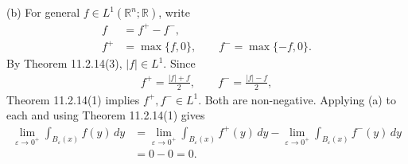 \documentclass[12pt,a4paper]{article}
\begin{document}
(b) For general $f\in L^1(\mathbb{R}^n;\mathbb{R})$, write
\begin{align*}
f&=f^+-f^-,\\
f^+&=\max\{f,0\},\qquad f^-=\max\{-f,0\}.
\end{align*}
By Theorem 11.2.14(3), $|f|\in L^1$. Since
\begin{align*}
f^+=\frac{|f|+f}{2},\qquad f^-=\frac{|f|-f}{2},
\end{align*}
Theorem 11.2.14(1) implies $f^+,f^-\in L^1$. Both are non-negative. Applying (a) to each and using Theorem 11.2.14(1) gives
\begin{align*}
\lim_{\varepsilon\to0^+}\int_{B_\varepsilon(x)}f(y)\,dy
&=\lim_{\varepsilon\to0^+}\int_{B_\varepsilon(x)}f^+(y)\,dy
-\lim_{\varepsilon\to0^+}\int_{B_\varepsilon(x)}f^-(y)\,dy\\
&=0-0=0.
\end{align*}
\end{document}
